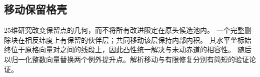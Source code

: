 \subsection{移动保留格壳}
25维研究改变保留点的几何，而不将所有改进限定在原头候选池内。
一个完整删除块在相反纬度上有保留的伙伴层；共同移动该层保持内部内积。
其水平坐标始终位于原格向量对之间的线段上，因此凸性统一解决与未动赤道的相容性。
随后以归一化整数向量替换两个例外提升点。解析移动与有限修复分别有简短的验证论证。
